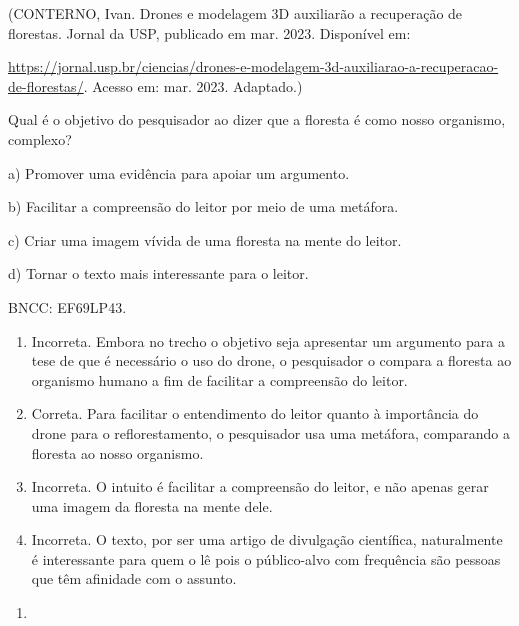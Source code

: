 (CONTERNO, Ivan. Drones e modelagem 3D auxiliarão a recuperação de
florestas. Jornal da USP, publicado em mar. 2023. Disponível em:

\url{https://jornal.usp.br/ciencias/drones-e-modelagem-3d-auxiliarao-a-recuperacao-de-florestas/}.
Acesso em: mar. 2023. Adaptado.)

Qual é o objetivo do pesquisador ao dizer que a floresta é como nosso
organismo, complexo?

a) Promover uma evidência para apoiar um argumento.

b) Facilitar a compreensão do leitor por meio de uma metáfora.

c) Criar uma imagem vívida de uma floresta na mente do leitor.

d) Tornar o texto mais interessante para o leitor.

BNCC: EF69LP43.

\begin{enumerate}
\def\labelenumi{\alph{enumi})}
\item
  Incorreta. Embora no trecho o objetivo seja apresentar um argumento
  para a tese de que é necessário o uso do drone, o pesquisador o
  compara a floresta ao organismo humano a fim de facilitar a
  compreensão do leitor.
\item
  Correta. Para facilitar o entendimento do leitor quanto à importância
  do drone para o reflorestamento, o pesquisador usa uma metáfora,
  comparando a floresta ao nosso organismo.
\item
  Incorreta. O intuito é facilitar a compreensão do leitor, e não apenas
  gerar uma imagem da floresta na mente dele.
\item
  Incorreta. O texto, por ser uma artigo de divulgação científica,
  naturalmente é interessante para quem o lê pois o público-alvo com
  frequência são pessoas que têm afinidade com o assunto.
\end{enumerate}

\begin{enumerate}
\def\labelenumi{\arabic{enumi}.}
\setcounter{enumi}{11}
\tightlist
\item
\end{enumerate}


